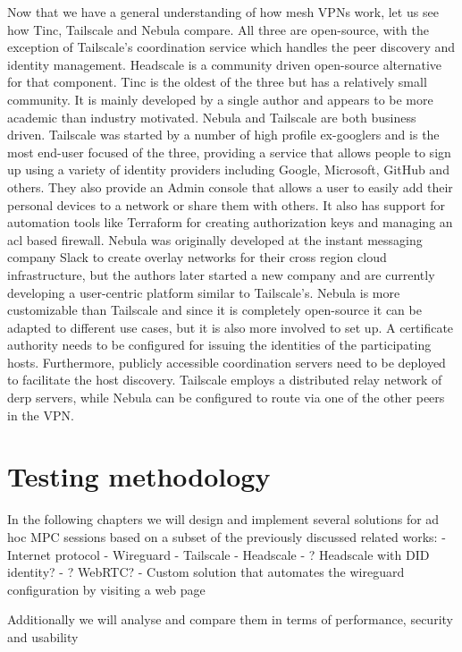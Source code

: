 Now that we have a general understanding of how mesh VPNs work, let us
see how Tinc, Tailscale and Nebula compare. All three are open-source,
with the exception of Tailscale's coordination service which handles the
peer discovery and identity management. Headscale
\autocite{fontJuanfontHeadscale2022} is a community driven open-source
alternative for that component. Tinc is the oldest of the three but has
a relatively small community. It is mainly developed by a single author
and appears to be more academic than industry motivated. Nebula and
Tailscale are both business driven. Tailscale was started by a number of
high profile ex-googlers and is the most end-user focused of the three,
providing a service that allows people to sign up using a variety of
identity providers including Google, Microsoft, GitHub and others. They
also provide an Admin console that allows a user to easily add their
personal devices to a network or share them with others. It also has
support for automation tools like Terraform for creating authorization
keys and managing an \gls{acl} based firewall. Nebula was originally
developed at the instant messaging company Slack to create overlay
networks for their cross region cloud infrastructure, but the authors
later started a new company and are currently developing a user-centric
platform similar to Tailscale's. Nebula is more customizable than
Tailscale and since it is completely open-source it can be adapted to
different use cases, but it is also more involved to set up. A
certificate authority needs to be configured for issuing the identities
of the participating hosts. Furthermore, publicly accessible
coordination servers need to be deployed to facilitate the host
discovery. Tailscale employs a distributed relay network of \gls{derp}
servers, while Nebula can be configured to route via one of the other
peers in the VPN.

\hypertarget{testing-methodology}{%
\chapter{Testing methodology}\label{testing-methodology}}

In the following chapters we will design and implement several solutions
for ad hoc MPC sessions based on a subset of the previously discussed
related works: - Internet protocol - Wireguard - Tailscale - Headscale -
? Headscale with DID identity? - ? WebRTC? - Custom solution that
automates the wireguard configuration by visiting a web page

Additionally we will analyse and compare them in terms of performance,
security and usability

